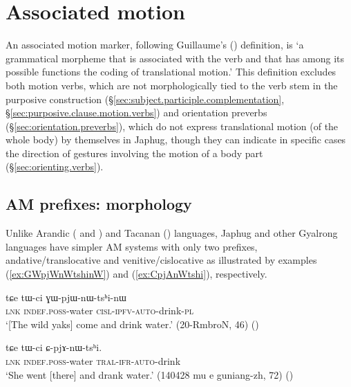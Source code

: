 \section{Associated motion} \label{sec:associated.motion}
An associated motion marker, following Guillaume's (\citeyear[13]{guillaume16am}) definition, is `a grammatical morpheme that is associated with the verb and that has among its possible functions the coding of translational motion.' This definition excludes both motion verbs, which are not morphologically tied to the verb stem in the purposive construction (§\ref{sec:subject.participle.complementation}, §\ref{sec:purposive.clause.motion.verbs}) and orientation preverbs (§\ref{sec:orientation.preverbs}), which do not express translational motion (of the whole body) by themselves in Japhug, though they can indicate in specific cases the direction of gestures involving the motion of a body part (§\ref{sec:orienting.verbs}).


\subsection{AM prefixes: morphology} \label{sec:am.prefixes}

Unlike Arandic (\citealt{koch84associated.motion} and \citealt{wilkins91associated.motion}) and Tacanan (\citealt{guillaume09mouv.assoc}) languages, Japhug and other Gyalrong languages have simpler AM systems with only two prefixes, andative/translocative and venitive/cislocative  as illustrated by examples (\ref{ex:GWpjWnWtshinW}) and (\ref{ex:CpjAnWtshi}), respectively.

\begin{exe}
\ex \label{ex:GWpjWnWtshinW}
\gll tɕe tɯ-ci ɣɯ-pjɯ-nɯ-tsʰi-nɯ  \\
\textsc{lnk} \textsc{indef}.\textsc{poss}-water \textsc{cisl}-\textsc{ipfv}-\textsc{auto}-drink-\textsc{pl} \\
\glt `[The wild yaks] come and drink water.' (20-RmbroN, 46)  ()
\end{exe}

\begin{exe}
\ex \label{ex:CpjAnWtshi}
\gll tɕe tɯ-ci ɕ-pjɤ-nɯ-tsʰi. \\
\textsc{lnk} \textsc{indef}.\textsc{poss}-water \textsc{tral}-\textsc{ifr}-\textsc{auto}-drink  \\
\glt `She went [there] and drank water.' (140428 mu e guniang-zh, 72) ()
\end{exe}

